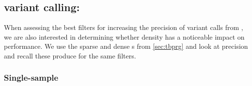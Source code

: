 \subsection{\ont{} variant calling: \pandora{}}
\label{sec:pandora-filters}

When assessing the best filters for increasing the precision of variant calls from \pandora{}, we are also interested in determining whether \prg{} density has a noticeable impact on performance. We use the sparse and dense \prg{}s from \autoref{sec:tbprg} and look at precision and recall these produce for the same filters.

\subsubsection{Single-sample}
\label{sec:map-var-calls}


